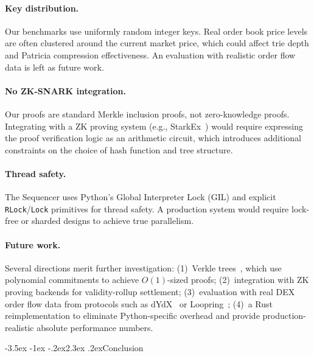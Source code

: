 \documentclass[letterpaper,twocolumn,10pt]{article}
\makeatletter
\renewcommand{\section}{\@startsection{section}{1}{\z@}%
  {-3.5ex \@plus -1ex \@minus -.2ex}{2.3ex \@plus.2ex}{\normalfont\large\bfseries}}
\makeatother
\begin{document}
\paragraph{Key distribution.}
Our benchmarks use uniformly random integer keys.
Real order book price levels are often clustered around the current market price, which could affect trie depth and Patricia compression effectiveness.
An evaluation with realistic order flow data is left as future work.

\paragraph{No ZK-SNARK integration.}
Our proofs are standard Merkle inclusion proofs, not zero-knowledge proofs.
Integrating with a ZK proving system (e.g., StarkEx~\cite{starkware2020starkex}) would require expressing the proof verification logic as an arithmetic circuit, which introduces additional constraints on the choice of hash function and tree structure.

\paragraph{Thread safety.}
The Sequencer uses Python's Global Interpreter Lock (GIL) and explicit \texttt{RLock}/\texttt{Lock} primitives for thread safety.
A production system would require lock-free or sharded designs to achieve true parallelism.

\paragraph{Future work.}
Several directions merit further investigation:
(1)~Verkle trees~\cite{kuszmaul2019verkle}, which use polynomial commitments to achieve $O(1)$-sized proofs;
(2)~integration with ZK proving backends for validity-rollup settlement;
(3)~evaluation with real DEX order flow data from protocols such as dYdX~\cite{dydx2021} or Loopring~\cite{wang2019loopring};
(4)~a Rust reimplementation to eliminate Python-specific overhead and provide production-realistic absolute performance numbers.

\section{Conclusion}
\label{sec:conclusion}
\end{document}
